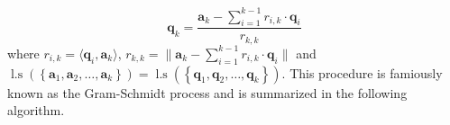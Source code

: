 \begin{equation}\label{eq: comp_orth_basis}
    \bm{q}_k = \frac{\bm{a}_k - \sum_{i=1}^{k-1} r_{i,k} \cdot \bm{q}_i}{r_{k,k}}
\end{equation}
where $r_{i,k} = \langle \bm{q}_i, \bm{a}_k \rangle$, $r_{k,k} = \| \bm{a}_k - \sum_{i=1}^{k-1} r_{i,k} \cdot \bm{q}_i \|$ and $\operatorname{l.s} \left( \left\{ \bm{a}_1, \bm{a}_2, \ldots , \bm{a}_k \right\} \right) = \operatorname{l.s} \left( \left\{ \bm{q}_1, \bm{q}_2, \ldots , \bm{q}_k \right\} \right)$. This procedure is famiously known as the Gram-Schmidt process and is summarized in the following algorithm.




